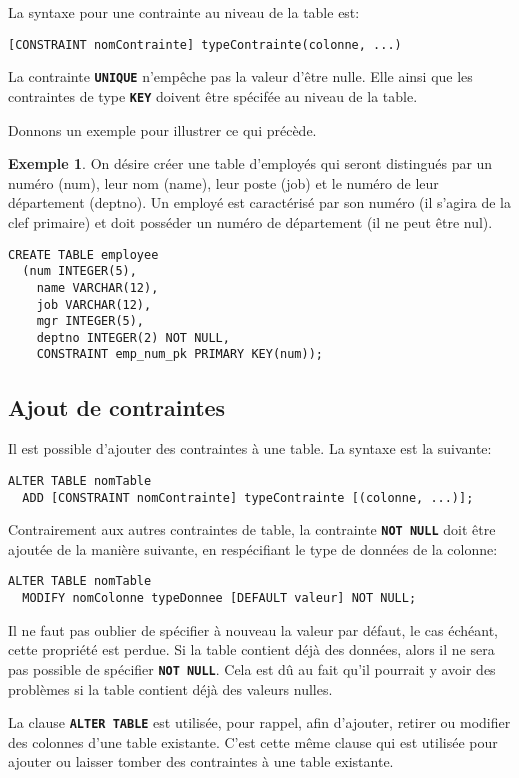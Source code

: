 \documentclass[a4paper, 12pt]{report}
\newcommand{\textSQL}[1]{\texttt{\textbf{#1}}}
\theoremstyle{definition} \newtheorem{ex}{Exemple}
\begin{document}
La syntaxe pour une contrainte au niveau de la table est:
\begin{lstlisting}[frame=single]
[CONSTRAINT nomContrainte] typeContrainte(colonne, ...)
\end{lstlisting}
La contrainte \textSQL{UNIQUE} n'empêche pas la valeur d'être nulle. Elle ainsi que les contraintes de type \textSQL{KEY} doivent être spécifée au niveau de la table.

Donnons un exemple pour illustrer ce qui précède.
\begin{ex} \label{ex:constraints}
On désire créer une table d'employés qui seront distingués par un numéro (num), leur nom (name), leur poste (job) et le numéro de leur département (deptno). Un employé est caractérisé par son numéro (il s'agira de la clef primaire) et doit posséder un numéro de département (il ne peut être nul).
\begin{lstlisting}[frame=single]
CREATE TABLE employee
  (num INTEGER(5),
	name VARCHAR(12),
	job VARCHAR(12),
	mgr INTEGER(5),
	deptno INTEGER(2) NOT NULL,
	CONSTRAINT emp_num_pk PRIMARY KEY(num));
\end{lstlisting}
\end{ex}

\subsection{Ajout de contraintes}
Il est possible d'ajouter des contraintes à une table. La syntaxe est la suivante:
\begin{lstlisting}[frame=single]
ALTER TABLE nomTable
  ADD [CONSTRAINT nomContrainte] typeContrainte [(colonne, ...)];
\end{lstlisting}
Contrairement aux autres contraintes de table, la contrainte \textSQL{NOT NULL} doit être ajoutée de la manière suivante, en respécifiant le type de données de la colonne:
\begin{lstlisting}[frame=single]
ALTER TABLE nomTable
  MODIFY nomColonne typeDonnee [DEFAULT valeur] NOT NULL;
\end{lstlisting}
Il ne faut pas oublier de spécifier à nouveau la valeur par défaut, le cas échéant, cette propriété est perdue. Si la table contient déjà des données, alors il ne sera pas possible de spécifier \textSQL{NOT NULL}. Cela est dû au fait qu'il pourrait y avoir des problèmes si la table contient déjà des valeurs nulles.

La clause \textSQL{ALTER TABLE} est utilisée, pour rappel, afin d'ajouter, retirer ou modifier des colonnes d'une table existante. C'est cette même clause qui est utilisée pour ajouter ou laisser tomber des contraintes à une table existante.
\end{document}
